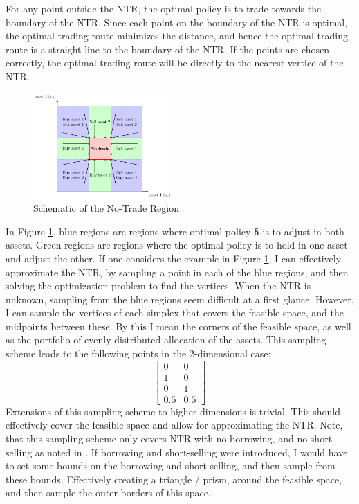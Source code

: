 \documentclass[11pt]{article}
\begin{document}
For any point outside the \ac{NTR},
the optimal policy is to trade towards the boundary of the \ac{NTR}. Since each point on the boundary of the NTR is optimal, the optimal trading route minimizes the
distance, and hence the optimal trading route is a straight line to the boundary of the \ac{NTR}. 
If the points are chosen correctly, the optimal trading route will be directly to the nearest vertice of the \ac{NTR}.
\begin{figure}[!ht]
  \centering
  \includegraphics[width=0.475\textwidth]{../Sections/tikzfigure.pdf} %
  \caption{Schematic of the No-Trade Region}
  \label{fig:no_trade_region_schematic}
\end{figure}
\FloatBarrier
In Figure \ref{fig:no_trade_region_schematic}, blue regions are regions where optimal policy $\boldsymbol{\delta}$ is to adjust in both assets.
Green regions are regions where the optimal policy is to hold in one asset and adjust the other. 
If one considers the example in Figure \ref{fig:no_trade_region_schematic}, I can effectively approximate the \ac{NTR},
by sampling a point in each of the blue regions, and then solving the optimization problem to find the vertices.
When the \ac{NTR} is unknown, sampling from the blue regions seem difficult at a first glance.
However, I can sample the vertices of each simplex that covers the feasible space, and the midpoints between these.
By this I mean the corners of the feasible space, as well as the portfolio of evenly distributed allocation of the assets.
This sampling scheme leads to the following points in the $2$-dimensional case:
\[
  \begin{bmatrix}
    0 & 0 \\
    1 & 0 \\
    0 & 1 \\
    0.5 & 0.5 
  \end{bmatrix}
\]
Extensions of this sampling scheme to higher dimensions is trivial.
This should effectively cover the feasible space and allow for approximating the \ac{NTR}. Note, that this sampling scheme only covers \ac{NTR}
with no borrowing, and no short-selling as noted in \autocite{Scheidegger2023}. If borrowing and short-selling were introduced, I would have to set some bounds on the borrowing and short-selling,
and then sample from these bounds. Effectively creating a triangle / prism, around the feasible space, and then sample the outer borders of this space.
\end{document}
